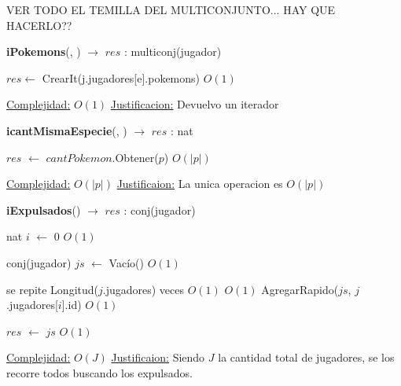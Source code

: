 \begin{Algoritmos}
\begin{algorithm}[H]
\begin{algorithmic}[1]
\end{algorithmic}
\end{algorithm}



VER TODO EL TEMILLA DEL MULTICONJUNTO... HAY QUE HACERLO?? 

\begin{algorithm}[H]
{\textbf{iPokemons}(, ) $\to$ $res$ : multiconj(jugador)}
\begin{algorithmic}[1]

\State $res \gets $ CrearIt(j.jugadores[e].pokemons) \Comment $O(1)$

\medskip
\State \underline{Complejidad:} $O(1)$
\State \underline{Justificacion:} Devuelvo un iterador

\end{algorithmic}
\end{algorithm}



\begin{algorithm}[H]
{\textbf{icantMismaEspecie}(, ) $\to$ $res$ : nat}
\begin{algorithmic}[1]

\State $res$ $\gets$ $cantPokemon$.Obtener($p$)  \Comment $O(|p|)$

\medskip
\Statex \underline{Complejidad:} $O(|p|)$
\Statex \underline{Justificaion:} La unica operacion es $O(|p|)$

\end{algorithmic}
\end{algorithm}  



\begin{algorithm}[H]
{\textbf{iExpulsados}() $\to$ $res$ : conj(jugador)}
\begin{algorithmic}[1]

\State nat $i$ $\gets$ 0 \Comment $O(1)$

\State conj(jugador) $js$ $\gets$ Vac\'io() \Comment $O(1)$

 \Comment se repite Longitud($j$.jugadores) veces $O(1)$
   \Comment $O(1)$
    \State AgregarRapido($js$, $j$.jugadores[$i$].id) \Comment $O(1)$
  \EndIf
\EndWhile

\State $res$ $\gets$ $js$ \Comment $O(1)$

\medskip
\Statex \underline{Complejidad:} $O(J)$
\Statex \underline{Justificaion:} Siendo $J$ la cantidad total de jugadores, se los recorre todos buscando los expulsados.


\end{algorithmic}
\end{algorithm}
\end{Algoritmos}
